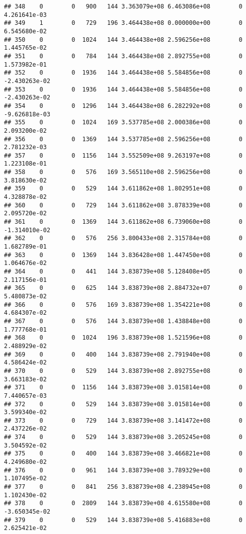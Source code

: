 \documentclass[
]{article}
\begin{document}
\begin{enumerate}
\begin{verbatim}
## 348    0        0   900   144 3.363079e+08 6.463086e+08        0  4.261641e-03
## 349    1        0   729   196 3.464438e+08 0.000000e+00        0  6.545680e-02
## 350    0        0  1024   144 3.464438e+08 2.596256e+08        0  1.445765e-02
## 351    0        0   784   144 3.464438e+08 2.892755e+08        0  1.573982e-01
## 352    0        0  1936   144 3.464438e+08 5.584856e+08        0 -2.430263e-02
## 353    0        0  1936   144 3.464438e+08 5.584856e+08        0 -2.430263e-02
## 354    0        0  1296   144 3.464438e+08 6.282292e+08        0 -9.626818e-03
## 355    0        0  1024   169 3.537785e+08 2.000386e+08        0  2.093200e-02
## 356    0        0  1369   144 3.537785e+08 2.596256e+08        0  2.781232e-03
## 357    0        0  1156   144 3.552509e+08 9.263197e+08        0  1.223108e-01
## 358    0        0   576   169 3.565110e+08 2.596256e+08        0  3.818630e-02
## 359    0        0   529   144 3.611862e+08 1.802951e+08        0  4.328878e-02
## 360    0        0   729   144 3.611862e+08 3.878339e+08        0  2.095720e-02
## 361    0        0  1369   144 3.611862e+08 6.739060e+08        0 -1.314010e-02
## 362    0        0   576   256 3.800433e+08 2.315784e+08        0  1.682789e-01
## 363    0        0  1369   144 3.836428e+08 1.447450e+08        0  1.064676e-02
## 364    0        0   441   144 3.838739e+08 5.128408e+05        0  2.117156e-01
## 365    0        0   625   144 3.838739e+08 2.884732e+07        0  5.480873e-02
## 366    0        0   576   169 3.838739e+08 1.354221e+08        0  4.684307e-02
## 367    0        0   576   144 3.838739e+08 1.438848e+08        0  1.777768e-01
## 368    0        0  1024   196 3.838739e+08 1.521596e+08        0  2.488929e-02
## 369    0        0   400   144 3.838739e+08 2.791940e+08        0  4.586424e-02
## 370    0        0   529   144 3.838739e+08 2.892755e+08        0  3.663183e-02
## 371    0        0  1156   144 3.838739e+08 3.015814e+08        0  7.440657e-03
## 372    0        0   529   144 3.838739e+08 3.015814e+08        0  3.599340e-02
## 373    0        0   729   144 3.838739e+08 3.141472e+08        0  2.437226e-02
## 374    0        0   529   144 3.838739e+08 3.205245e+08        0  3.504592e-02
## 375    0        0   400   144 3.838739e+08 3.466821e+08        0  4.249680e-02
## 376    0        0   961   144 3.838739e+08 3.789329e+08        0  1.107495e-02
## 377    0        0   841   256 3.838739e+08 4.238945e+08        0  1.102430e-02
## 378    0        0  2809   144 3.838739e+08 4.615580e+08        0 -3.650345e-02
## 379    0        0   529   144 3.838739e+08 5.416883e+08        0  2.625421e-02

\end{verbatim}
\end{enumerate}
\end{document}
